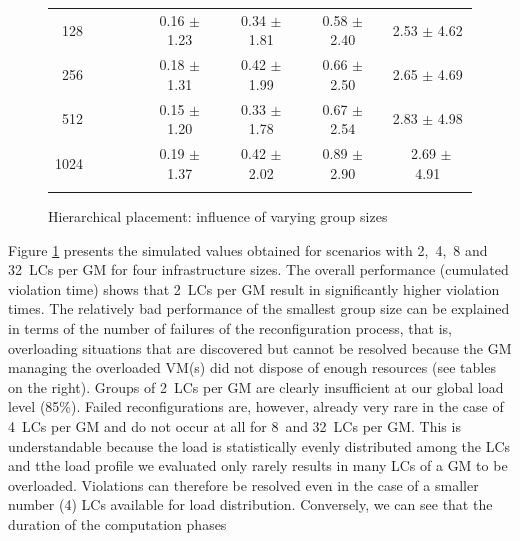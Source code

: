 \begin{figure}
\begin{minipage}{.60\textwidth}
{{\begin{tabular}[b]{|r@{\:}||@{\:}c@{\:}|@{\:}c@{\:}|@{\:}c@{\:}|@{\:}c@{\:}|}
        128~~~~~~~ &   0.16 $\pm$   1.23 &   0.34 $\pm$   1.81 &   0.58 $\pm$   2.40 &   2.53 $\pm$   4.62  \\
        256~~~~~~~ &   0.18 $\pm$   1.31 &   0.42 $\pm$   1.99 &   0.66 $\pm$   2.50 &   2.65 $\pm$   4.69  \\
        512~~~~~~~ &   0.15 $\pm$   1.20 &   0.33 $\pm$   1.78 &   0.67 $\pm$   2.54 &   2.83 $\pm$   4.98  \\
       1024~~~~~~~ &   0.19 $\pm$   1.37 &   0.42 $\pm$   2.02 &   0.89 $\pm$   2.90 &   ~2.69 $\pm$   4.91

      \Rstrut  \\ \hline
      \thickhline
  \end{tabular} }
  \label{fig:groupSizesComputationTime}
  }
\end{minipage}
\vspace*{-.6cm}
\caption{Hierarchical placement: influence of varying group sizes}
\label{fig:snoozeGroupSizes}
\vspace*{-.6cm}
\end{figure}
%
%
Figure \ref{fig:snoozeGroupSizes} presents the simulated values
obtained for scenarios with 2,~4,~8 and 32~LCs per GM for four
infrastructure sizes. The overall performance (\ie cumulated violation
time) shows that
2~LCs per GM result in significantly higher violation times.
The relatively bad performance of the smallest group size can be
explained in terms of the number of failures of the reconfiguration
process, that is, overloading situations that are discovered but
cannot be resolved because the GM managing the overloaded VM(s) did
not dispose of enough resources (see tables on the right).
Groups of 2~LCs per GM are clearly insufficient at our global load level (85\%).
Failed reconfigurations are, however, already very rare in the case of
4~LCs per GM and do not occur at all for 8~and 32~LCs per GM. This is
understandable because the load is statistically evenly distributed
among the LCs and tthe load profile we evaluated only rarely results
in many LCs of a GM to be overloaded. Violations can therefore be
resolved even in the case of a smaller number (4) LCs available for
load distribution.
Conversely, we can see that the duration of the computation phases
